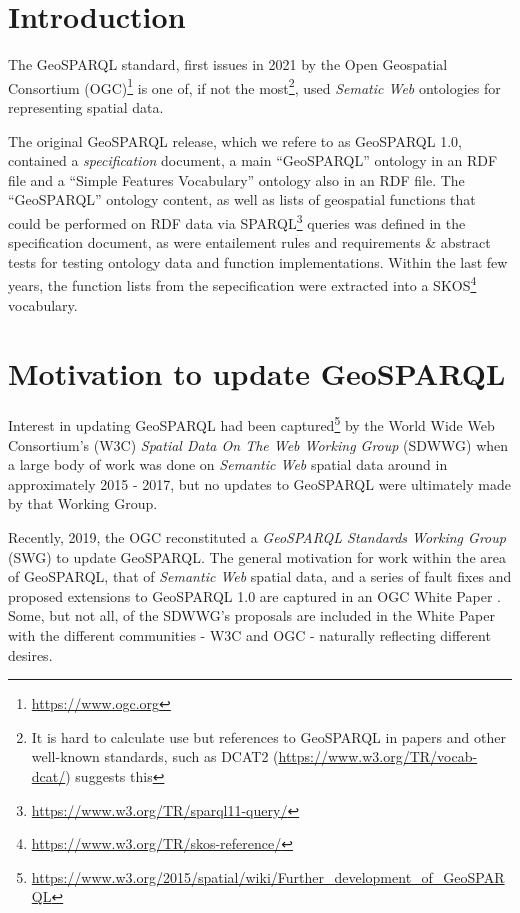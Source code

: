 \documentclass[runningheads]{llncs}
\begin{document}
\section{Introduction}\label{sec:introduction}
The GeoSPARQL standard, first issues in 2021 by the Open Geospatial Consortium (OGC)\footnote{\url{https://www.ogc.org}} 
is one of, if not the most\footnote{It is hard to calculate use but references to GeoSPARQL in papers and other 
well-known standards, such as DCAT2 (\url{https://www.w3.org/TR/vocab-dcat/}) suggests this}, used 
\textit{Sematic Web} ontologies for representing spatial data.

The original GeoSPARQL release, which we refere to as GeoSPARQL 1.0, contained a \textit{specification} document,
a main ``GeoSPARQL'' ontology in an RDF file and a ``Simple Features Vocabulary'' ontology also in an RDF file. The 
``GeoSPARQL'' ontology content, as well as lists of geospatial functions that could be performed on RDF data via 
SPARQL\footnote{\url{https://www.w3.org/TR/sparql11-query/}} queries was defined in the specification document, as
were entailement rules and requirements \& abstract tests for testing ontology data and function implementations. 
Within the last few years, the function lists from the sepecification were extracted into a SKOS\footnote{\url{https://www.w3.org/TR/skos-reference/}}
vocabulary.


\section{Motivation to update GeoSPARQL}\label{sec:motivation}
Interest in updating GeoSPARQL had been captured\footnote{\url{https://www.w3.org/2015/spatial/wiki/Further_development_of_GeoSPARQL}}
 by the World Wide Web Consortium's (W3C) \textit{Spatial Data On The Web Working Group} (SDWWG)
when a large body of work was done on \textit{Semantic Web} spatial data around in approximately 2015 - 2017, but 
no updates to GeoSPARQL were ultimately made by that Working Group.


Recently, 2019, the OGC reconstituted a \textit{GeoSPARQL Standards Working Group} (SWG) to update GeoSPARQL. The general 
motivation for work within the area of GeoSPARQL, that of \textit{Semantic Web} spatial data, and a series of
fault fixes and proposed extensions to GeoSPARQL 1.0 are captured in an OGC White Paper \cite{geosparqlwhitepaper}. Some,
but not all, of the SDWWG's proposals are included in the White Paper with the different communities - W3C and OGC - 
naturally reflecting different desires.
\end{document}
